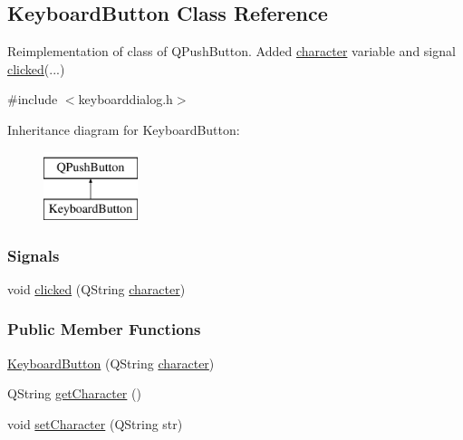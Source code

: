 \hypertarget{classKeyboardButton}{}\subsection{Keyboard\+Button Class Reference}
\label{classKeyboardButton}
Reimplementation of class of QPushButton. Added \hyperlink{classKeyboardButton_a8979a4765bd83241a9a253211ec03774}{character} variable and signal \hyperlink{classKeyboardButton_a6c6694c8330565de78f47f3c5fe11d06}{clicked}(...)

{\ttfamily \#include $<$keyboarddialog.\+h$>$}

Inheritance diagram for Keyboard\+Button\+:\begin{figure}[H]
\begin{center}
\leavevmode
\includegraphics[height=2.000000cm]{classKeyboardButton}
\end{center}
\end{figure}
\subsubsection*{Signals}
\begin{DoxyCompactItemize}
\item 
void \mbox{\hyperlink{classKeyboardButton_a6c6694c8330565de78f47f3c5fe11d06}{clicked}} (Q\+String \mbox{\hyperlink{classKeyboardButton_a8979a4765bd83241a9a253211ec03774}{character}})
\end{DoxyCompactItemize}
\subsubsection*{Public Member Functions}
\begin{DoxyCompactItemize}
\item 
\mbox{\hyperlink{classKeyboardButton_ac2eac39f778e78dad45bac730e6a30bd}{Keyboard\+Button}} (Q\+String \mbox{\hyperlink{classKeyboardButton_a8979a4765bd83241a9a253211ec03774}{character}})
\item 
Q\+String \mbox{\hyperlink{classKeyboardButton_a44c7448a3bae4dbc1a3f4f7ecbaeafbd}{get\+Character}} ()
\item 
void \mbox{\hyperlink{classKeyboardButton_aca3123dc3392dc90f631bf8004a71061}{set\+Character}} (Q\+String str)
\end{DoxyCompactItemize}
